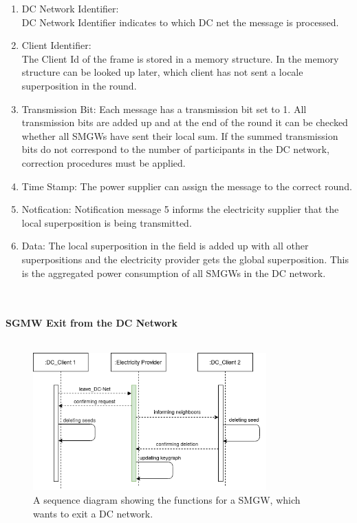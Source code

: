 \begin{enumerate}
\item DC Network Identifier:\\
DC Network Identifier indicates to which DC net the message is processed.
\item Client Identifier:\\
The Client Id of the frame is stored in a memory structure. In the memory structure can be looked up later, which client has not sent a locale superposition in the round.
\item Transmission Bit: Each message has a transmission bit set to 1. All transmission bits are added up and at the end of the round it can be checked whether all SMGWs have sent their local sum. If the summed transmission bits do not correspond to the number of participants in the DC network, correction procedures must be applied.
\item Time Stamp: The power supplier can assign the message to the correct round.
\item Notfication: Notification message 5 informs the electricity supplier that the local superposition is being transmitted.
\item Data:
The local superposition in the field is added up with all other superpositions and the electricity provider gets the global superposition. This is the aggregated power consumption of all SMGWs in the DC network.
\end{enumerate}
\\
\\
\textbf{SGMW Exit from the DC Network}
\\
\\
\begin{figure}[tbp]
  \centering
  \includegraphics[width=0.8\textwidth]{images/Exit.png}
  \caption[Sequence Diagram Exiting]{A sequence diagram showing the functions for a SMGW, which wants to exit a DC network.}
  \label{fig:Exit}
\end{figure}
